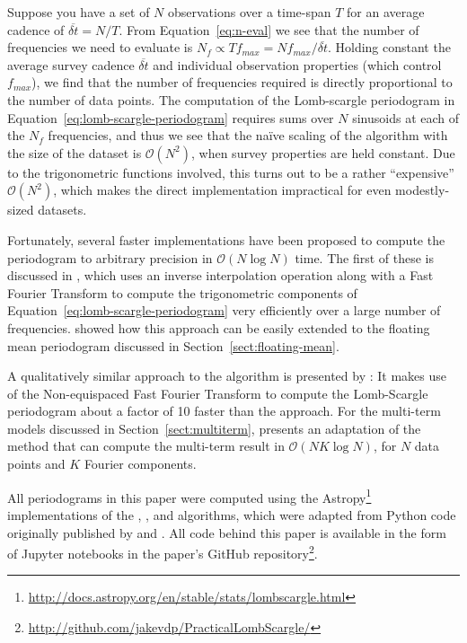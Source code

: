 \documentclass[preprint]{aastex}
\newcommand{\Eq}[1]{Equation~\ref{eq:#1}}
\newcommand{\eq}[1]{\Eq{#1}}
\newcommand{\Sect}[1]{Section~\ref{sect:#1}}
\newcommand{\sect}[1]{\Sect{#1}}
\begin{document}
Suppose you have a set of $N$ observations over a time-span $T$ for an average
cadence of $\overline{\delta t} = N/T$.
From \eq{n-eval} we see that the number of frequencies we need to evaluate is
$N_f \propto T f_{max} = N f_{max} / \overline{\delta t}$.
Holding constant the average survey cadence $\overline{\delta t}$ and individual
observation properties (which control $f_{max}$), we find that the number of
frequencies required is directly proportional to the number of data points.
The computation of the Lomb-scargle periodogram in \eq{lomb-scargle-periodogram}
requires sums over $N$ sinusoids at each of the
$N_f$ frequencies, and thus we see that the
na{\"i}ve scaling of the algorithm with the size of the dataset is
$\mathcal{O}(N^2)$, when survey properties are held constant.
Due to the trigonometric functions involved, this turns out to be a rather
``expensive'' $\mathcal{O}(N^2)$, which makes the direct
implementation impractical for even modestly-sized datasets.

Fortunately, several faster implementations have been proposed to compute the
periodogram to arbitrary precision in $\mathcal{O}(N\log N)$ time.
The first of these is discussed in \citet{Press89}, which uses an inverse
interpolation operation along with a Fast Fourier Transform to compute the
trigonometric components of \eq{lomb-scargle-periodogram} very efficiently over
a large number of frequencies.
\citet{Zechmeister09} showed how this approach can be easily extended to
the floating mean periodogram discussed in \sect{floating-mean}.

A qualitatively similar approach to the \citet{Press89} algorithm
is presented by \citet{Leroy2012}:
It makes use of the Non-equispaced Fast Fourier Transform
\citep[NFFT, see][]{Keiner2009} to compute the Lomb-Scargle periodogram about
a factor of 10 faster than the \citet{Press89} approach.
For the multi-term models discussed in \sect{multiterm}, \citet{Palmer09}
presents an adaptation of the \citet{Press89} method that can compute the
multi-term result in $\mathcal{O}(NK\log N)$, for $N$ data points and
$K$ Fourier components.

All periodograms in this paper were computed using the
Astropy\footnote{\url{http://docs.astropy.org/en/stable/stats/lombscargle.html}}
implementations of the \citet{Press89}, \citet{Zechmeister09}, and
\citet{Palmer09} algorithms, which were adapted from Python code originally
published by \citet{ICVG2014} and \citet{VanderPlas2015}.
All code behind this paper is available in the form of Jupyter notebooks in the
paper's GitHub repository\footnote{\url{http://github.com/jakevdp/PracticalLombScargle/}}.
\end{document}
